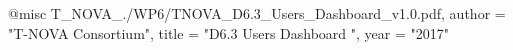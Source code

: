 @misc{ T_NOVA_./WP6/TNOVA_D6.3_Users_Dashboard_v1.0.pdf,
       author = "T-NOVA Consortium",
       title = "D6.3 Users Dashboard ",
       year = "2017" }
